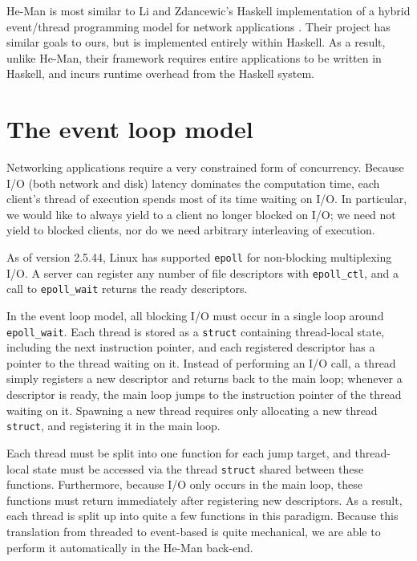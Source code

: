\documentclass[preprint,11pt]{sigplanconf}
\renewcommand{\t}{\texttt}
\begin{document}

He-Man is most similar to Li and Zdancewic's Haskell implementation of a hybrid
event/thread programming model for network applications \cite{LiZdancewic}.
Their project has similar goals to ours, but is implemented entirely within
Haskell. As a result, unlike He-Man, their framework requires entire
applications to be written in Haskell, and incurs runtime overhead from the
Haskell system.

\section{The event loop model}

Networking applications require a very constrained form of concurrency. Because
I/O (both network and disk) latency dominates the computation time, each
client's thread of execution spends most of its time waiting on I/O. In
particular, we would like to always yield to a client no longer blocked on I/O;
we need not yield to blocked clients, nor do we need arbitrary interleaving of
execution.

As of version 2.5.44, Linux has supported \t{epoll} for non-blocking
multiplexing I/O. A server can register any number of file descriptors with
\t{epoll\_ctl}, and a call to \t{epoll\_wait} returns the ready descriptors. 

In the event loop model, all blocking I/O must occur in a single loop around
\t{epoll\_wait}. Each thread is stored as a \t{struct} containing thread-local
state, including the next instruction pointer, and each registered descriptor
has a pointer to the thread waiting on it. Instead of performing an I/O call, a
thread simply registers a new descriptor and returns back to the main loop;
whenever a descriptor is ready, the main loop jumps to the instruction pointer
of the thread waiting on it. Spawning a new thread requires only allocating a
new thread \t{struct}, and registering it in the main loop.

Each thread must be split into one function for each jump target, and
thread-local state must be accessed via the thread \t{struct} shared between
these functions. Furthermore, because I/O only occurs in the main loop, these
functions must return immediately after registering new descriptors. As a
result, each thread is split up into quite a few functions in this paradigm.
Because this translation from threaded to event-based is quite mechanical, we
are able to perform it automatically in the He-Man back-end.
\end{document}
